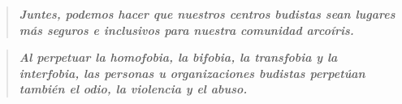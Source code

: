 \documentclass[12pt,openany]{book}
\begin{document}
\begin{figure}[ht]
\end{figure}

\color{purple}
\begin{quote}
\centering
\doublespacing
\textit{\Large \textbf{Juntes, podemos hacer que nuestros centros budistas sean lugares más seguros e inclusivos para nuestra comunidad arcoíris.}}
\end{quote}

\newpage
\thispagestyle{empty}

\begin{quote}
\doublespacing
\centering
\textit{\Large \textbf{Al perpetuar la homofobia, la bifobia, la transfobia y la interfobia, las personas u organizaciones budistas perpetúan también el odio, la violencia y el abuso.}}
\end{quote}

\begin{figure}[h]
    \centering
\end{figure}
\end{document}
